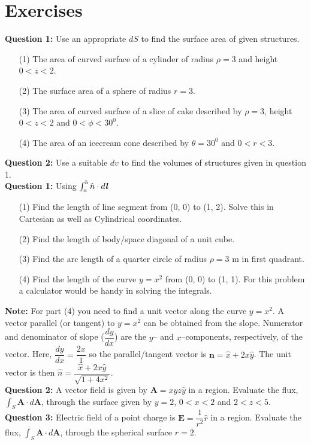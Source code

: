 \documentclass[12pt,a4paper]{article}
\begin{document}
\section{Exercises}
\noindent\textbf{Question 1:} Use an appropriate $dS$ to find the surface area of given structures.
\begin{itemize}
\item[(1)] The area of curved surface of a cylinder of radius $\rho=3$ and height $0<z<2$.
\item[(2)] The surface area of a sphere of radius $r=3$.
\item[(3)] The area of curved surface of a slice of cake described by $\rho=3$, height $0<z<2$ and $0<\phi<30^0$.
\item[(4)] The area of an icecream cone described by $\theta=30^0$ and $0<r<3$.
\end{itemize}
\noindent\textbf{Question 2:} Use a suitable $dv$ to find the volumes of structures given in question 1.\\[0.2cm]
\noindent\textbf{Question 1:} Using $\int_{a}^{b}\hat n\cdot d\textbf{\textit{l}}$
\begin{itemize}
\item[(1)] Find the length of line segment from (0, 0) to (1, 2). Solve this in Cartesian as well as Cylindrical coordinates.
\item[(2)] Find the length of body/space diagonal of a unit cube.
\item[(3)] Find the arc length of a quarter circle of radius $\rho=3$ m in first quadrant.
\item[(4)] Find the length of the curve $y=x^2$ from (0, 0) to (1, 1). For this problem a calculator would be handy in solving the integrals.
\end{itemize}
\noindent\textbf{Note:} For part (4) you need to find a unit vector along the curve $y=x^2$. A vector parallel (or tangent) to $y=x^2$ can be obtained from the slope. Numerator and denominator of slope ($\dfrac{dy}{dx}$) are the $y$-- and $x$--components, respectively, of the vector. Here, $\dfrac{dy}{dx}=\dfrac{2x}{1}$ so the parallel/tangent vector is $\textbf{n}=\hat x+2x\hat y$. The unit vector is then $\hat n=\dfrac{\hat x+2x\hat y}{\sqrt{1+4x^2}}$.\\[0.2cm]
\noindent\textbf{Question 2:} A vector field is given by $\textbf{A}=xyz\hat y$ in a region. Evaluate the flux, $\int_{S}\textbf{A}\cdot d\textbf{A}$, through the surface given by $y=2$, $0<x<2$ and $2<z<5$.\\[0.2cm]
\noindent\textbf{Question 3:} Electric field of a point charge is $\textbf{E}=\dfrac{1}{r^2}\hat r$ in a region. Evaluate the flux, $\int_{S}\textbf{A}\cdot d\textbf{A}$, through the spherical surface $r=2$.\\[0.2cm]
\end{document}
